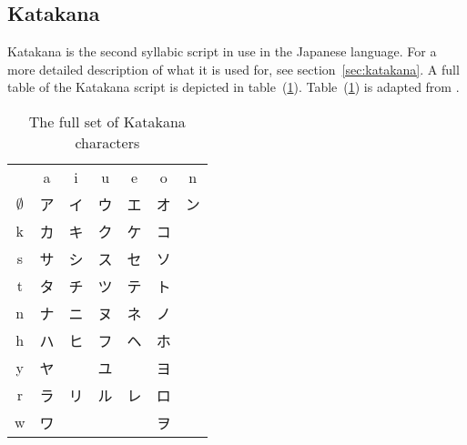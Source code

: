 \subsection{Katakana }
\label{sec:app:katakana}

Katakana is the second syllabic script in use in the Japanese language. 
For a more detailed description of what it is used for, see 
section~\ref{sec:katakana}.
A full table of the Katakana script is depicted in 
table~(\ref{table:fullkatakana}).
Table~(\ref{table:fullkatakana}) is adapted from .

\begin{table}[htbp]
\begin{CJK}
  \begin{tabular}{c c c c c c c}
 &a&i&u&e&o&n\\
$\emptyset$&ア&イ&ウ&エ&オ&ン\\
k&カ&キ&ク&ケ&コ&\\
s&サ&シ&ス&セ&ソ&\\
t&タ&チ&ツ&テ&ト&\\
n&ナ&ニ&ヌ&ネ&ノ&\\
h&ハ&ヒ&フ&ヘ&ホ&\\
y&ヤ&　&ユ&　&ヨ&\\
r&ラ&リ&ル&レ&ロ&\\
w&ワ&　&　&　&ヲ&\\
  \end{tabular}
\end{CJK}
\caption{The full set of Katakana characters}
\label{table:fullkatakana}
\end{table}


